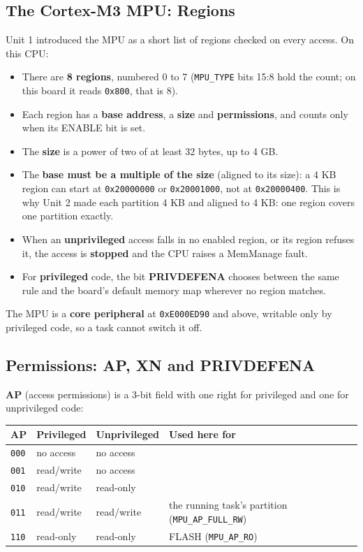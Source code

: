 \subsection{The Cortex-M3 MPU: Regions}

Unit 1 introduced the MPU as a short list of regions checked on every access. On this CPU:

\begin{itemize}
    \item There are \textbf{8 regions}, numbered 0 to 7 (\texttt{MPU\_TYPE} bits 15:8 hold the count; on this board it reads \texttt{0x800}, that is 8).
    \item Each region has a \textbf{base address}, a \textbf{size} and \textbf{permissions}, and counts only when its ENABLE bit is set.
    \item The \textbf{size} is a power of two of at least 32 bytes, up to 4 GB.
    \item The \textbf{base must be a multiple of the size} (aligned to its size): a 4 KB region can start at \texttt{0x20000000} or \texttt{0x20001000}, not at \texttt{0x20000400}. This is why Unit 2 made each partition 4 KB and aligned to 4 KB: one region covers one partition exactly.
    \item When an \textbf{unprivileged} access falls in no enabled region, or its region refuses it, the access is \textbf{stopped} and the CPU raises a MemManage fault.
    \item For \textbf{privileged} code, the bit \textbf{PRIVDEFENA} chooses between the same rule and the board's default memory map wherever no region matches.
\end{itemize}

The MPU is a \textbf{core peripheral} at \texttt{0xE000ED90} and above, writable only by privileged code, so a task cannot switch it off.

\subsection{Permissions: AP, XN and PRIVDEFENA}

\textbf{AP} (access permissions) is a 3-bit field with one right for privileged and one for unprivileged code:

\begin{center}
\begin{tabular}{|l|l|l|p{5cm}|}
\hline
\textbf{AP} & \textbf{Privileged} & \textbf{Unprivileged} & \textbf{Used here for} \\
\hline
\texttt{000} & no access & no access & \\
\hline
\texttt{001} & read/write & no access & \\
\hline
\texttt{010} & read/write & read-only & \\
\hline
\texttt{011} & read/write & read/write & the running task's partition (\texttt{MPU\_AP\_FULL\_RW}) \\
\hline
\texttt{110} & read-only & read-only & FLASH (\texttt{MPU\_AP\_RO}) \\
\hline
\end{tabular}
\end{center}

